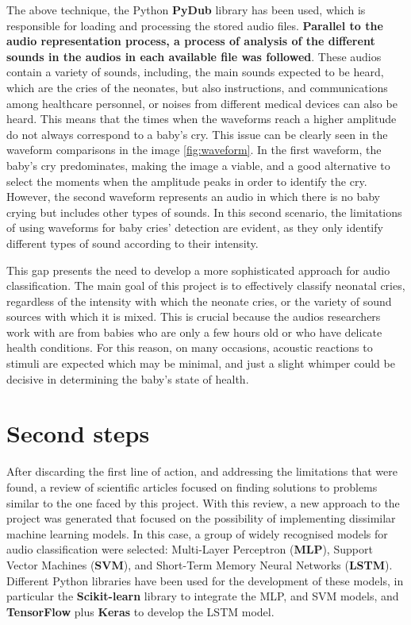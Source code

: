 The above technique, the Python \textbf{PyDub} library has been used, which is responsible for loading and processing the stored audio files. \textbf{Parallel to the audio representation process, a process of analysis of the different sounds in the audios in each available file was followed}. These audios contain a variety of sounds, including, the main sounds expected to be heard, which are the cries of the neonates, but also instructions, and communications among healthcare personnel, or noises from different medical devices can also be heard. This means that the times when the waveforms reach a higher amplitude do not always correspond to a baby's cry. This issue can be clearly seen in the waveform comparisons in the image \ref{fig:waveform}. In the first waveform, the baby's cry predominates, making the image a viable, and a good alternative to select the moments when the amplitude peaks in order to identify the cry. However, the second waveform represents an audio in which there is no baby crying but includes other types of sounds. In this second scenario, the limitations of using waveforms for baby cries’ detection are evident, as they only identify different types of sound according to their intensity.


This gap presents the need to develop a more sophisticated approach for audio classification. The main goal of this project is to effectively classify neonatal cries, regardless of the intensity with which the neonate cries, or the variety of sound sources with which it is mixed. This is crucial because the audios researchers work with are from babies who are only a few hours old or who have delicate health conditions. For this reason, on many occasions, acoustic reactions to stimuli are expected which may be minimal, and just a slight whimper could be decisive in determining the baby's state of health.

\section{Second steps}
After discarding the first line of action, and addressing the limitations that were found, a review of scientific articles \cite{Bashiri2020, Chang2020, Ji2020, K2021, Liang2022, zabidi2009classification, Wahid2016, Orlandi2016} focused on finding solutions to problems similar to the one faced by this project. With this review, a new approach to the project was generated that focused on the possibility of implementing dissimilar machine learning models. In this case, a group of widely recognised models for audio classification were selected: Multi-Layer Perceptron (\textbf{MLP}), Support Vector Machines (\textbf{SVM}), and Short-Term Memory Neural Networks (\textbf{LSTM}). Different Python libraries have been used for the development of these models, in particular the \textbf{Scikit-learn} library to integrate the MLP, and SVM models, and \textbf{TensorFlow} plus \textbf{Keras} to develop the LSTM model.


